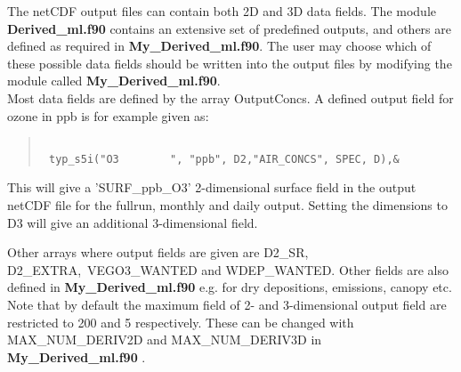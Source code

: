 
% 

The netCDF output files can contain both 2D and 3D data fields. The module 
{ \bf Derived\_ml.f90 } contains an extensive set of predefined outputs, and
others are defined as required in { \bf My\_Derived\_ml.f90}. 
The user may choose which of these possible data fields should be written 
into the output files by modifying the module called { \bf My\_Derived\_ml.f90}.\\

Most data fields are defined by the array OutputConcs. A defined output 
field for ozone in ppb is for example given  as:
\begin{quote}
\begin{verbatim}

 typ_s5i("O3        ", "ppb", D2,"AIR_CONCS", SPEC, D),& 

\end{verbatim}
\end{quote}
This will give a 'SURF\_ppb\_O3' 2-dimensional surface field in the output netCDF file for 
the fullrun, monthly and daily output. 
Setting the dimensions to D3 will give an additional 3-dimensional field. 


Other arrays where output fields are given are D2\_SR, D2\_EXTRA,\
 VEGO3\_WANTED and 
WDEP\_WANTED. Other fields are also defined in { \bf My\_Derived\_ml.f90 } e.g. for dry 
depositions, emissions, canopy etc. \\



Note that by default the maximum field of 2- and 3-dimensional output field are 
restricted to 200 and 5 respectively. These can be changed with MAX\_NUM\_DERIV2D and MAX\_NUM\_DERIV3D 
in { \bf My\_Derived\_ml.f90 }.


